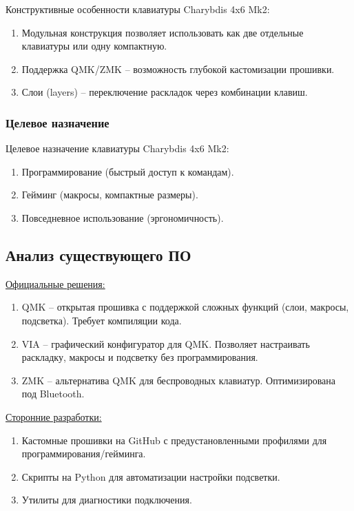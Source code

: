 Конструктивные особенности клавиатуры Charybdis 4x6 Mk2:

\begin{enumerate}
\item Модульная конструкция позволяет использовать как две отдельные клавиатуры или одну компактную.
\item Поддержка QMK/ZMK -- возможность глубокой кастомизации прошивки.
\item Слои (layers) -- переключение раскладок через комбинации клавиш.
\end{enumerate}

\subsubsection{Целевое назначение}

Целевое назначение клавиатуры Charybdis 4x6 Mk2:

\begin{enumerate}
\item Программирование (быстрый доступ к командам).
\item Гейминг (макросы, компактные размеры).
\item Повседневное использование (эргономичность).
\end{enumerate}

\subsection{Анализ существующего ПО}

\underline{Официальные решения:}

\begin{enumerate}
\item QMK -- открытая прошивка с поддержкой сложных функций (слои, макросы, подсветка). Требует компиляции кода.
\item VIA -- графический конфигуратор для QMK. Позволяет настраивать раскладку, макросы и подсветку без программирования.
\item ZMK -- альтернатива QMK для беспроводных клавиатур. Оптимизирована под Bluetooth.
\end{enumerate}

\underline{Сторонние разработки:}

\begin{enumerate}
\item Кастомные прошивки на GitHub с предустановленными профилями для программирования/гейминга.
\item Скрипты на Python для автоматизации настройки подсветки.
\item Утилиты для диагностики подключения.
\end{enumerate}

